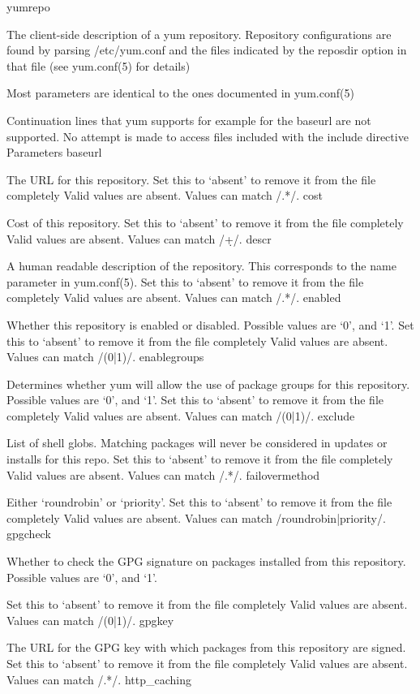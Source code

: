 yumrepo

The client-side description of a yum repository. Repository configurations are found by parsing /etc/yum.conf and the files indicated by the reposdir option in that file (see yum.conf(5) for details)

Most parameters are identical to the ones documented in yum.conf(5)

Continuation lines that yum supports for example for the baseurl are not supported. No attempt is made to access files included with the include directive
Parameters
baseurl

The URL for this repository. Set this to ‘absent’ to remove it from the file completely Valid values are absent. Values can match /.*/.
cost

Cost of this repository. Set this to ‘absent’ to remove it from the file completely Valid values are absent. Values can match /\d+/.
descr

A human readable description of the repository. This corresponds to the name parameter in yum.conf(5). Set this to ‘absent’ to remove it from the file completely Valid values are absent. Values can match /.*/.
enabled

Whether this repository is enabled or disabled. Possible values are ‘0’, and ‘1’. Set this to ‘absent’ to remove it from the file completely Valid values are absent. Values can match /(0|1)/.
enablegroups

Determines whether yum will allow the use of package groups for this repository. Possible values are ‘0’, and ‘1’. Set this to ‘absent’ to remove it from the file completely Valid values are absent. Values can match /(0|1)/.
exclude

List of shell globs. Matching packages will never be considered in updates or installs for this repo. Set this to ‘absent’ to remove it from the file completely Valid values are absent. Values can match /.*/.
failovermethod

Either ‘roundrobin’ or ‘priority’. Set this to ‘absent’ to remove it from the file completely Valid values are absent. Values can match /roundrobin|priority/.
gpgcheck

Whether to check the GPG signature on packages installed from this repository. Possible values are ‘0’, and ‘1’.

Set this to ‘absent’ to remove it from the file completely Valid values are absent. Values can match /(0|1)/.
gpgkey

The URL for the GPG key with which packages from this repository are signed. Set this to ‘absent’ to remove it from the file completely Valid values are absent. Values can match /.*/.
http_caching

